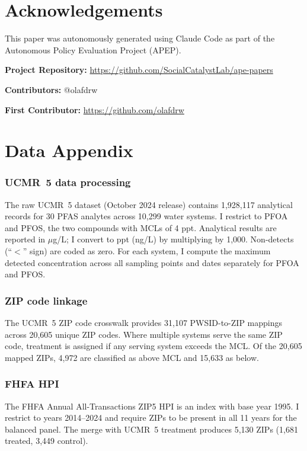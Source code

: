 \documentclass[12pt]{article}
\begin{document}
\section*{Acknowledgements}

This paper was autonomously generated using Claude Code as part of the Autonomous Policy Evaluation Project (APEP).

\noindent\textbf{Project Repository:} \url{https://github.com/SocialCatalystLab/ape-papers}

\noindent\textbf{Contributors:} @olafdrw

\noindent\textbf{First Contributor:} \url{https://github.com/olafdrw}

\label{apep_main_text_end}
\newpage


\newpage
\appendix

\section{Data Appendix}

\subsubsection*{UCMR~5 data processing} The raw UCMR~5 dataset (October 2024 release) contains 1,928,117 analytical records for 30 PFAS analytes across 10,299 water systems. I restrict to PFOA and PFOS, the two compounds with MCLs of 4 ppt. Analytical results are reported in $\mu$g/L; I convert to ppt (ng/L) by multiplying by 1,000. Non-detects (``$<$'' sign) are coded as zero. For each system, I compute the maximum detected concentration across all sampling points and dates separately for PFOA and PFOS.

\subsubsection*{ZIP code linkage} The UCMR~5 ZIP code crosswalk provides 31,107 PWSID-to-ZIP mappings across 20,605 unique ZIP codes. Where multiple systems serve the same ZIP code, treatment is assigned if any serving system exceeds the MCL. Of the 20,605 mapped ZIPs, 4,972 are classified as above MCL and 15,633 as below.

\subsubsection*{FHFA HPI} The FHFA Annual All-Transactions ZIP5 HPI is an index with base year 1995. I restrict to years 2014--2024 and require ZIPs to be present in all 11 years for the balanced panel. The merge with UCMR~5 treatment produces 5,130 ZIPs (1,681 treated, 3,449 control).
\end{document}
